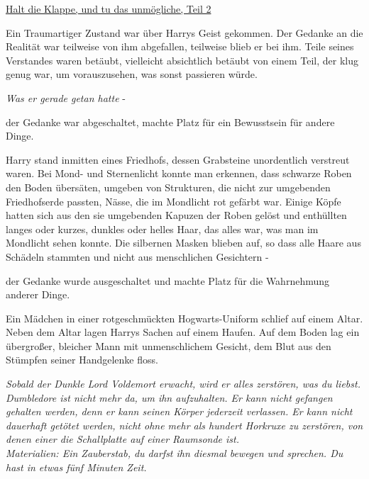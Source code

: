 

\hypertarget{halt-die-klappe-und-tu-das-unmuxf6gliche-teil-2}{%

\uline{Halt die Klappe, und tu das unmögliche, Teil 2\\ }

Ein Traumartiger Zustand war über Harrys Geist gekommen. Der Gedanke an die Realität war teilweise von ihm abgefallen, teilweise blieb er bei ihm. Teile seines Verstandes waren betäubt, vielleicht absichtlich betäubt von einem Teil, der klug genug war, um vorauszusehen, was sonst passieren würde.

\emph{Was er gerade getan hatte} -

der Gedanke war abgeschaltet, machte Platz für ein Bewusstsein für andere Dinge.

Harry stand inmitten eines Friedhofs, dessen Grabsteine unordentlich verstreut waren. Bei Mond- und Sternenlicht konnte man erkennen, dass schwarze Roben den Boden übersäten, umgeben von Strukturen, die nicht zur umgebenden Friedhofserde passten, Nässe, die im Mondlicht rot gefärbt war. Einige Köpfe hatten sich aus den sie umgebenden Kapuzen der Roben gelöst und enthüllten langes oder kurzes, dunkles oder helles Haar, das alles war, was man im Mondlicht sehen konnte. Die silbernen Masken blieben auf, so dass alle Haare aus Schädeln stammten und nicht aus menschlichen Gesichtern -

der Gedanke wurde ausgeschaltet und machte Platz für die Wahrnehmung anderer Dinge.

Ein Mädchen in einer rotgeschmückten Hogwarts-Uniform schlief auf einem Altar. Neben dem Altar lagen Harrys Sachen auf einem Haufen. Auf dem Boden lag ein übergroßer, bleicher Mann mit unmenschlichem Gesicht, dem Blut aus den Stümpfen seiner Handgelenke floss.

\emph{Sobald der Dunkle Lord Voldemort erwacht, wird er alles zerstören, was du liebst. Dumbledore ist nicht mehr da, um ihn aufzuhalten. Er kann nicht gefangen gehalten werden, denn er kann seinen Körper jederzeit verlassen. Er kann nicht dauerhaft getötet werden, nicht ohne mehr als hundert Horkruxe zu zerstören, von denen einer die Schallplatte auf einer Raumsonde ist.}\\ \emph{Materialien: Ein Zauberstab, du darfst ihn diesmal bewegen und sprechen. Du hast in etwas fünf Minuten Zeit.}

}
